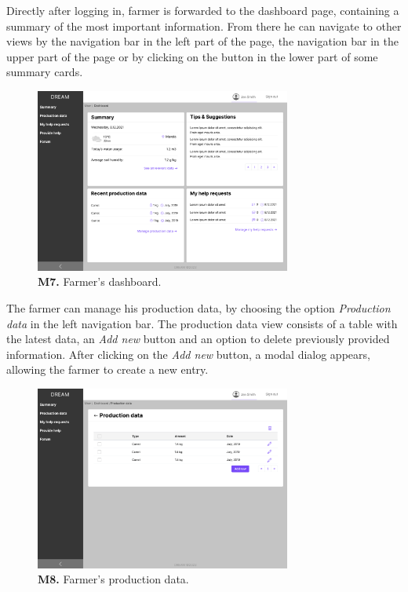     Directly after logging in, farmer is forwarded to the dashboard page, containing a summary of the most important information. From there he can navigate to other views by the navigation bar in the left part of the page, the navigation bar in the upper part of the page or by clicking on the button in the lower part of some summary cards.  
    \begin{figure}[H]
        \centering
        \includegraphics[width=0.75\textwidth]{mockups/Farmer_Dashboard.png}
        \caption{\textbf{M7.} Farmer's dashboard.}
    \end{figure}
    
    The farmer can manage his production data, by choosing the option \textit{Production data} in the left navigation bar. The production data view consists of a table with the latest data, an \textit{Add new} button and an option to delete previously provided information. After clicking on the \textit{Add new} button, a modal dialog appears, allowing the farmer to create a new entry.
    \begin{figure}[H]
        \centering
        \includegraphics[width=0.75\textwidth]{mockups/Farmer_Dashboard_Production data.png}
        \caption{\textbf{M8.} Farmer's production data.}
    \end{figure}
    
